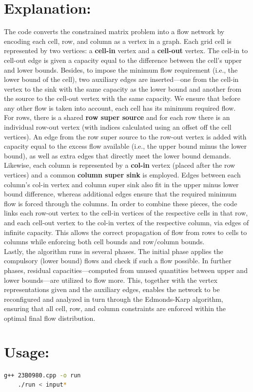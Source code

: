 \documentclass{report}
\begin{document}
\section*{Explanation:}
 {\fontsize{12}{0} \selectfont

  The code converts the constrained matrix problem into a flow network by
  encoding
  each cell, row, and column as a vertex in a graph. Each grid cell is
  represented by two vertices: a
  \textbf{cell-in} vertex and a \textbf{cell-out} vertex. The cell-in to
  cell-out edge is given
  a capacity equal to the difference between the cell's upper and lower bounds.
  Besides, to impose the minimum flow requirement (i.e., the lower bound of the
  cell), two auxiliary edges are inserted—one from the cell-in vertex to the
  sink
  with the same capacity as the lower bound and another from the source to the
  cell-out vertex with the same capacity. We ensure that before any
  other flow is taken into account, each cell has its minimum required flow.
  \\[0.3cm]
  For rows, there is a shared \textbf{row super source} and for each row there
  is an
  individual row-out vertex (with indices calculated using an offset off the
  cell
  vertices). An edge from the row super source to the row-out vertex is added
  with capacity equal to the excess flow available (i.e., the upper bound minus
  the lower bound), as well as extra edges that directly meet the lower bound
  demands. Likewise, each column is represented by a \textbf{col-in} vertex
  (placed
  after the row vertices) and a common \textbf{column super sink} is employed.
  Edges
  between each column's col-in vertex and column super sink also fit in the
  upper
  minus lower bound difference, whereas additional edges ensure that the
  required
  minimum flow is forced through the columns. In order to combine these pieces,
  the code links each row-out vertex to the cell-in vertices of the respective
  cells in that row, and each cell-out vertex to the col-in vertex of the
  respective column, via edges of infinite capacity. This allows the
  correct propagation of flow from rows to cells to columns while
  enforcing both cell bounds and row/column bounds.
  \\[0.3cm]
  Lastly, the algorithm runs in several phases. The initial phase applies the
  compulsory (lower bound) flows and check if such a flow possible. In further
  phases,
  residual capacities—computed from unused quantities between upper and lower
  bounds—are utilized to flow more. This, together with the
  vertex representations given and the auxiliary edges, enables the network to
  be
  reconfigured and analyzed in turn through the Edmonds-Karp algorithm,
  ensuring
  that all cell, row, and column constraints are enforced within the optimal
  final flow distribution.
 }

\section*{Usage:}
\begin{lstlisting}[language=bash]
    g++ 23B0980.cpp -o run
    ./run < input*
\end{lstlisting}
\end{document}
